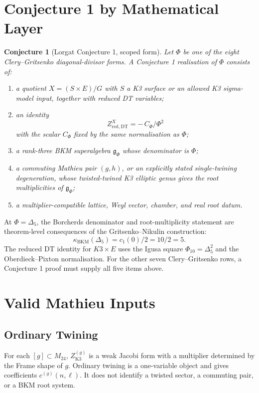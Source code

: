 \documentclass[11pt]{article}
\newtheorem{conjecture}[theorem]{Conjecture}
\providecommand{\kBKM}{\kappa_{\mathrm{BKM}}}
\providecommand{\red}{\mathrm{red}}
\providecommand{\DT}{\mathrm{DT}}
\providecommand{\fg}{\mathfrak{g}}
\providecommand{\Delf}{\Delta_5}
\providecommand{\Zg}{Z^{(g)}_{\mathrm{K3}}}
\begin{document}
\section{Conjecture 1 by Mathematical Layer}

\begin{conjecture}[Lorgat Conjecture 1, scoped form]
Let \(\Phi\) be one of the eight Clery--Gritsenko diagonal-divisor
forms.  A Conjecture 1 realisation of \(\Phi\) consists of:
\begin{enumerate}[label=(C\arabic*)]
\item a quotient \(X=(S\times E)/G\) with \(S\) a K3 surface or an
allowed K3 sigma-model input, together with reduced DT variables;
\item an identity
\[
  Z^{X}_{\red,\DT}=-\,C_\Phi/\Phi^2
\]
with the scalar \(C_\Phi\) fixed by the same normalisation as \(\Phi\);
\item a rank-three BKM superalgebra \(\fg_\Phi\) whose denominator is
\(\Phi\);
\item a commuting Mathieu pair \((g,h)\), or an explicitly stated
single-twining degeneration, whose twisted-twined K3 elliptic genus
gives the root multiplicities of \(\fg_\Phi\);
\item a multiplier-compatible lattice, Weyl vector, chamber, and real
root datum.
\end{enumerate}
\end{conjecture}

At \(\Phi=\Delf\), the Borcherds denominator and root-multiplicity
statement are theorem-level consequences of the Gritsenko--Nikulin
construction:
\[
  \kBKM(\Delf)=c_1(0)/2=10/2=5.
\]
The reduced DT identity for \(K3\times E\) uses the Igusa square
\(\Phi_{10}=\Delf^2\) and the Oberdieck--Pixton normalisation.  For the
other seven Clery--Gritsenko rows, a Conjecture 1 proof must supply all
five items above.

\section{Valid Mathieu Inputs}

\subsection{Ordinary Twining}

For each \([g]\subset M_{24}\), \(\Zg\) is a weak Jacobi form with a
multiplier determined by the Frame shape of \(g\).  Ordinary twining is
a one-variable object and gives coefficients \(c^{(g)}(n,\ell)\).  It
does not identify a twisted sector, a commuting pair, or a BKM root
system.
\end{document}
